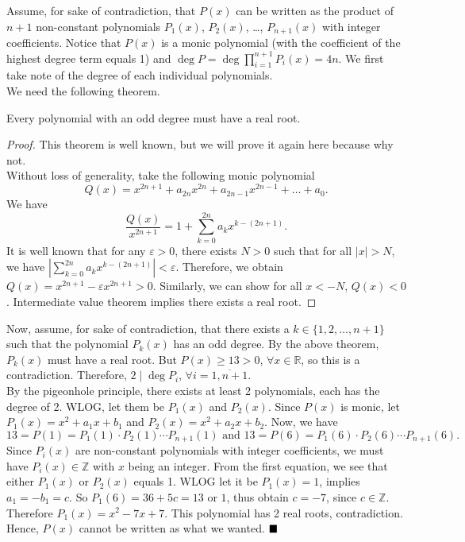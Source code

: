 \documentclass[11pt]{article}
\newcommand{\divides}{\mid}
\newenvironment{solution}[1][Solution]{%
  \proof[\normalfont \faPenNib \hspace{0.2cm} \ttfamily \scshape \large #1]%
}{\(\hfill \blacksquare\){\parfillskip0pt\par}}
\theoremstyle{definition}
\begin{document}
        \begin{solution}
            Assume, for sake of contradiction, that \(P(x)\) can be written as the product of \(n + 1\) non-constant polynomials \(P_1(x)\), \(P_2(x)\), \dots, \(P_{n+1}(x)\) with integer coefficients. Notice that \(P(x)\) is a monic polynomial (with the coefficient of the highest degree term equals 1) and \(\deg P = \deg \prod\limits_{i=1}^{n+1}P_i(x) = 4n\). We first take note of the degree of each individual polynomials.\\
            We need the following theorem.

            \begin{claim}
                Every polynomial with an odd degree must have a real root.
            \end{claim}

            \begin{proof}
                This theorem is well known, but we will prove it again here because why not.\\
                Without loss of generality, take the following monic polynomial
                \[Q(x) = x^{2n+1} + a_{2n}x^{2n} + a_{2n-1}x^{2n-1} + \dots + a_0.\]
                We have
                \[\frac{Q(x)}{x^{2n+1}} = 1 + \sum_{k=0}^{2n} a_kx^{k-(2n+1)}.\]
                It is well known that for any \(\varepsilon > 0\), there exists \(N > 0\) such that for all \(\left|x\right| > N\), we have \(\left|\sum_{k=0}^{2n} a_kx^{k-(2n+1)}\right| < \varepsilon\). Therefore, we obtain \(Q(x) = x^{2n+1} - \varepsilon x^{2n+1} > 0\). Similarly, we can show for all \(x < -N\), \(Q(x) < 0\). Intermediate value theorem implies there exists a real root.
            \end{proof}

            Now, assume, for sake of contradiction, that there exists a \(k \in \{1,2,\dots,n+1\}\) such that the polynomial \(P_k(x)\) has an odd degree. By the above theorem, \(P_k(x)\) must have a real root. But \(P(x) \geq 13 > 0\), \(\forall x \in \mathbb{R}\), so this is a contradiction. Therefore, \(2 \divides \deg P_i\), \(\forall i = \overline{1,n+1}\).\\
            By the pigeonhole principle, there exists at least 2 polynomials, each has the degree of 2. WLOG, let them be \(P_1(x)\) and \(P_2(x)\). Since \(P(x)\) is monic, let \(P_1(x) = x^2 + a_1x + b_1\) and \(P_2(x) = x^2 + a_2x + b_2\). Now, we have
            \[13 = P(1) = P_1(1) \cdot P_2(1) \cdots P_{n+1}(1) \text{ \ and \ } 13 = P(6) = P_1(6) \cdot P_2(6) \cdots P_{n+1}(6).\]
            Since \(P_i(x)\) are non-constant polynomials with integer coefficients, we must have \(P_i(x) \in \mathbb{Z}\) with \(x\) being an integer. From the first equation, we see that either \(P_1(x)\) or \(P_2(x)\) equals 1. WLOG let it be \(P_1(x) = 1\), implies \(a_1 = -b_1 = c\). So \(P_1(6) = 36 + 5c = 13\) or \(1\), thus obtain \(c = -7\), since \(c \in \mathbb{Z}\). Therefore \(P_1(x) = x^2 - 7x + 7\). This polynomial has 2 real roots, contradiction.\\
            Hence, \(P(x)\) cannot be written as what we wanted.
        \end{solution}
\end{document}
